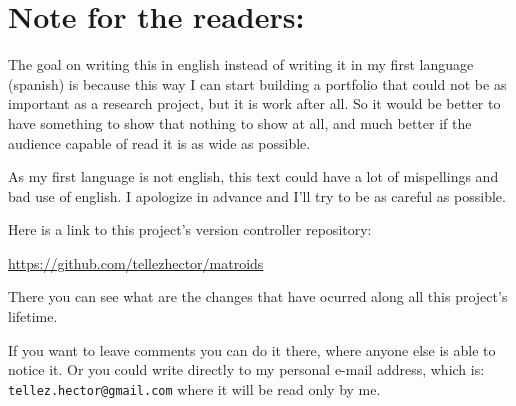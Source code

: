 \chapter*{Note for the readers:}
    The goal on writing this in english instead of writing it in my first language (spanish) is because 
    this way I can start building a portfolio that could not be as important as a research project, but
    it is work after all. So it would be better to have something to show that nothing to show at all, 
    and much better if the audience capable of read it is as wide as possible.\pn
    
    As my first language is not english, this text could have a lot of mispellings and
    bad use of english. I apologize in advance and I'll try to be as careful as possible.\pn
    
    Here is a link to this project's version controller repository:\par
    \href{https://github.com/tellezhector/matroids}{https://github.com/tellezhector/matroids}\par
    There you can see what are the changes that have ocurred along all this project's lifetime.\pn
    
    If you want to leave comments you can do it there, where anyone else is able to notice it. Or you could 
    write directly to my personal e-mail address, which is: \texttt{tellez.hector@gmail.com} where it will be read only
    by me.